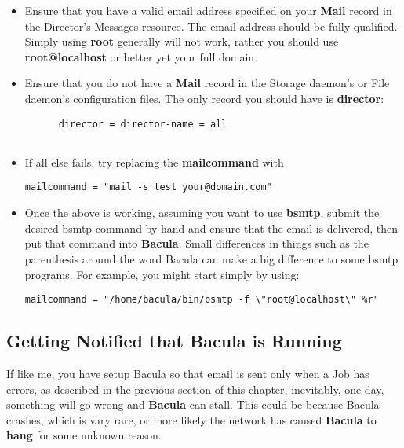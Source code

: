 \begin{itemize}
\item Ensure that you have a valid email address specified on your  {\bf Mail}
   record in the Director's Messages resource. The email  address should be fully
   qualified. Simply using {\bf root} generally  will not work, rather you should
use {\bf root@localhost} or better  yet your full domain.  
\item Ensure that you do not have a {\bf Mail} record in the Storage  daemon's
   or File daemon's configuration files. The only record  you should have is {\bf
   director}:  

\footnotesize
\begin{verbatim}
      director = director-name = all
      
\end{verbatim}
\normalsize

\item If all else fails, try replacing the {\bf mailcommand} with 

   \footnotesize
\begin{verbatim}
mailcommand = "mail -s test your@domain.com"
\end{verbatim}
\normalsize

\item Once the above is working, assuming you want to use {\bf bsmtp},  submit
   the desired bsmtp command by hand and ensure that the email  is delivered,
   then put that command into {\bf Bacula}. Small  differences in things such as
the parenthesis around the word  Bacula can make a big difference to some
bsmtp programs.  For example, you might start simply by using: 

\footnotesize
\begin{verbatim}
mailcommand = "/home/bacula/bin/bsmtp -f \"root@localhost\" %r"
\end{verbatim}
\normalsize

\end{itemize}

\subsection*{Getting Notified that Bacula is Running}
\label{JobNotification}

If like me, you have setup Bacula so that email is sent only when a Job has
errors, as described in the previous section of this chapter, inevitably, one
day, something will go wrong and {\bf Bacula} can stall. This could be because
Bacula crashes, which is vary rare, or more likely the network has caused {\bf
Bacula} to {\bf hang} for some unknown reason. 

